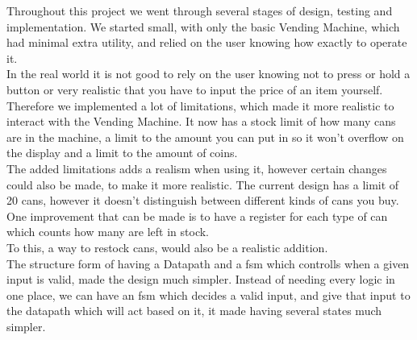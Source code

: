 
Throughout this project we went through several stages of design, testing and implementation. We started small, with only the basic Vending Machine, which had minimal extra utility, and relied on the user knowing how exactly to operate it. \\
In the real world it is not good to rely on the user knowing not to press or hold a button or very realistic that you have to input the price of an item yourself. Therefore we implemented a lot of limitations, which made it more realistic to interact with the Vending Machine. It now has a stock limit of how many cans are in the machine, a limit to the amount you can put in so it won't overflow on the display and a limit to the amount of coins.\\[0.1in]
The added limitations adds a realism when using it, however certain changes could also be made, to make it more realistic. The current design has a limit of 20 cans, however it doesn't distinguish between different kinds of cans you buy. One improvement that can be made is to have a register for each type of can which counts how many are left in stock. \\
To this, a way to restock cans, would also be a realistic addition.\\[0.1in]
The structure form of having a Datapath and a fsm which controlls when a given input is valid, made the design much simpler. Instead of needing every logic in one place, we can have an fsm which decides a valid input, and give that input to the datapath which will act based on it, it made having several states much simpler.


